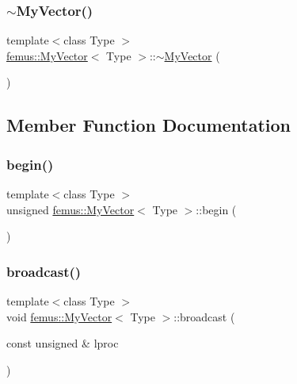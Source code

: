 \mbox{\label{classfemus_1_1_my_vector_a9ad9f54fb83df4cb645ff2fc6b33d88f}} 
\subsubsection{\texorpdfstring{$\sim$\+My\+Vector()}{~MyVector()}}
{\footnotesize\ttfamily template$<$class Type $>$ \\
\mbox{\hyperlink{classfemus_1_1_my_vector}{femus\+::\+My\+Vector}}$<$ Type $>$\+::$\sim$\mbox{\hyperlink{classfemus_1_1_my_vector}{My\+Vector}} (\begin{DoxyParamCaption}{ }\end{DoxyParamCaption})}



\subsection{Member Function Documentation}
\mbox{\label{classfemus_1_1_my_vector_a21d4832fe66e6c3b600b8afe35a27e87}} 
\subsubsection{\texorpdfstring{begin()}{begin()}}
{\footnotesize\ttfamily template$<$class Type $>$ \\
unsigned \mbox{\hyperlink{classfemus_1_1_my_vector}{femus\+::\+My\+Vector}}$<$ Type $>$\+::begin (\begin{DoxyParamCaption}{ }\end{DoxyParamCaption})}

\mbox{\label{classfemus_1_1_my_vector_a9e2317981b8070d85accb4d6c042f036}} 
\subsubsection{\texorpdfstring{broadcast()}{broadcast()}}
{\footnotesize\ttfamily template$<$class Type $>$ \\
void \mbox{\hyperlink{classfemus_1_1_my_vector}{femus\+::\+My\+Vector}}$<$ Type $>$\+::broadcast (\begin{DoxyParamCaption}\item[{const unsigned \&}]{lproc }\end{DoxyParamCaption})}

